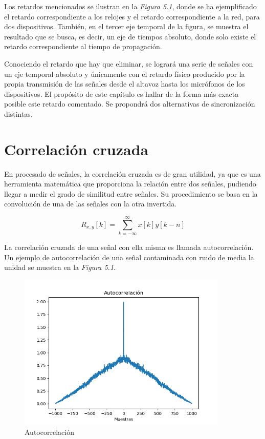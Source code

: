\documentclass[a4paper,11pt]{book}
\begin{document}
Los retardos mencionados se ilustran en la \textit{Figura 5.1}, donde se ha ejemplificado el retardo correspondiente a los relojes y el retardo correspondiente a la red, para dos dispositivos. También, en el tercer eje temporal de la figura, se muestra el resultado que se busca, es decir, un eje de tiempos absoluto, donde solo existe el retardo correspondiente al tiempo de propagación.

Conociendo el retardo que hay que eliminar, se logrará una serie de señales con un eje temporal absoluto y únicamente con el retardo físico producido por la propia transmisión de las señales desde el altavoz hasta los micrófonos de los dispositivos. El propósito de este capítulo es hallar de la forma más exacta posible este retardo comentado. Se propondrá dos alternativas de sincronización distintas.


\section{Correlación cruzada}
En procesado de señales, la correlación cruzada es de gran utilidad, ya que es una herramienta matemática que proporciona la relación entre dos señales, pudiendo llegar a medir el grado de similitud entre señales. Su procedimiento se basa en la convolución de una de las señales con la otra invertida.

\begin{equation}
R_{x,y}[k] = \sum_{k = -\infty}^{\infty} x[k] y[k-n]
\end{equation}

La correlación cruzada de una señal con ella misma es llamada autocorrelación. Un ejemplo de autocorrelación de una señal contaminada con ruido de media la unidad se muestra en la \textit{Figura 5.1}.

\begin{figure}[hbtp]
 \centering
 \includegraphics[width = 10cm]{FIGURAS/autocorrelacion.png}
 \caption{Autocorrelación}
 \end{figure}
\end{document}
